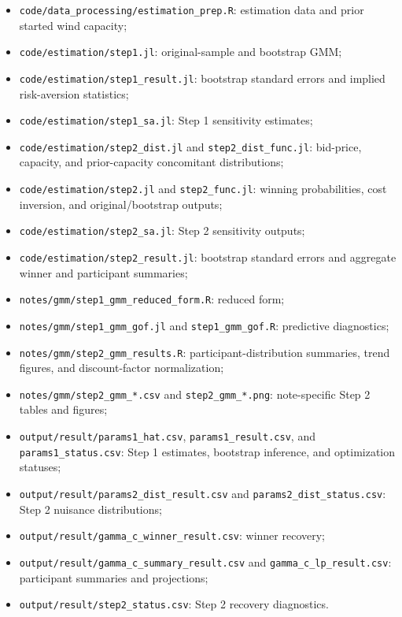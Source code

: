 \documentclass[10pt]{article}
\begin{document}
\begin{itemize}
\item \texttt{code/data\_processing/estimation\_prep.R}: estimation data and
prior started wind capacity;

\item \texttt{code/estimation/step1.jl}: original-sample and bootstrap GMM;

\item \texttt{code/estimation/step1\_result.jl}: bootstrap standard errors and
implied risk-aversion statistics;

\item \texttt{code/estimation/step1\_sa.jl}: Step 1 sensitivity estimates;

\item \texttt{code/estimation/step2\_dist.jl} and
\texttt{step2\_dist\_func.jl}: bid-price, capacity, and prior-capacity
concomitant distributions;

\item \texttt{code/estimation/step2.jl} and \texttt{step2\_func.jl}: winning
probabilities, cost inversion, and original/bootstrap outputs;

\item \texttt{code/estimation/step2\_sa.jl}: Step 2 sensitivity outputs;

\item \texttt{code/estimation/step2\_result.jl}: bootstrap standard errors and
aggregate winner and participant summaries;

\item \texttt{notes/gmm/step1\_gmm\_reduced\_form.R}: reduced form;

\item \texttt{notes/gmm/step1\_gmm\_gof.jl} and
\texttt{step1\_gmm\_gof.R}: predictive diagnostics;

\item \texttt{notes/gmm/step2\_gmm\_results.R}: participant-distribution
summaries, trend figures, and discount-factor normalization;

\item \texttt{notes/gmm/step2\_gmm\_*.csv} and
\texttt{step2\_gmm\_*.png}: note-specific Step 2 tables and figures;

\item \texttt{output/result/params1\_hat.csv},
\texttt{params1\_result.csv}, and \texttt{params1\_status.csv}: Step 1
estimates, bootstrap inference, and optimization statuses;

\item \texttt{output/result/params2\_dist\_result.csv} and
\texttt{params2\_dist\_status.csv}: Step 2 nuisance distributions;

\item \texttt{output/result/gamma\_c\_winner\_result.csv}: winner recovery;

\item \texttt{output/result/gamma\_c\_summary\_result.csv} and
\texttt{gamma\_c\_lp\_result.csv}: participant summaries and projections;

\item \texttt{output/result/step2\_status.csv}: Step 2 recovery diagnostics.
\end{itemize}
\end{document}
